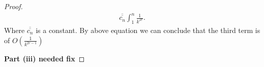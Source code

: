 \begin{proof}
\begin{align}
  \overline{\overline{c_n}}  \int_1^n  \frac{1}{k^{2 r}} .
\label{eq:term3}
\end{align}
Where $\overline{\overline{c_n}}$ is a constant. By above equation we can conclude that the third term is of $O(\frac{1}{k^{2 r -1}})$
%

\textbf{Part (iii) needed fix} 
\end{proof}
